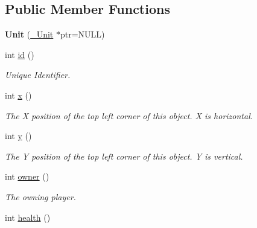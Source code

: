 \subsection*{Public Member Functions}
\begin{DoxyCompactItemize}
\item 
\hypertarget{classUnit_a137b06047ff3c863b7b8b11d6166b23b}{
{\bfseries Unit} (\hyperlink{struct__Unit}{\_\-Unit} $\ast$ptr=NULL)}
\label{classUnit_a137b06047ff3c863b7b8b11d6166b23b}

\item 
\hypertarget{classUnit_ac56a5f3e5c6ad3018e6370a8d9cc3d8d}{
int \hyperlink{classUnit_ac56a5f3e5c6ad3018e6370a8d9cc3d8d}{id} ()}
\label{classUnit_ac56a5f3e5c6ad3018e6370a8d9cc3d8d}

\begin{DoxyCompactList}\small\item\em Unique Identifier. \item\end{DoxyCompactList}\item 
\hypertarget{classUnit_aeaaab5b23cb47ac5a73b765e23d822eb}{
int \hyperlink{classUnit_aeaaab5b23cb47ac5a73b765e23d822eb}{x} ()}
\label{classUnit_aeaaab5b23cb47ac5a73b765e23d822eb}

\begin{DoxyCompactList}\small\item\em The X position of the top left corner of this object. X is horizontal. \item\end{DoxyCompactList}\item 
\hypertarget{classUnit_aed8851f757a1d06dc12a36714436cf5d}{
int \hyperlink{classUnit_aed8851f757a1d06dc12a36714436cf5d}{y} ()}
\label{classUnit_aed8851f757a1d06dc12a36714436cf5d}

\begin{DoxyCompactList}\small\item\em The Y position of the top left corner of this object. Y is vertical. \item\end{DoxyCompactList}\item 
\hypertarget{classUnit_ad7266891b96b1475e3d3b0e17b049121}{
int \hyperlink{classUnit_ad7266891b96b1475e3d3b0e17b049121}{owner} ()}
\label{classUnit_ad7266891b96b1475e3d3b0e17b049121}

\begin{DoxyCompactList}\small\item\em The owning player. \item\end{DoxyCompactList}\item 
\hypertarget{classUnit_a35f886bfd981fada012f6d579686ca66}{
int \hyperlink{classUnit_a35f886bfd981fada012f6d579686ca66}{health} ()}
\label{classUnit_a35f886bfd981fada012f6d579686ca66}


\end{DoxyCompactItemize}
